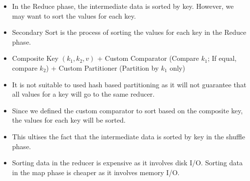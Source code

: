 \documentclass[10pt, landscape]{article}
\begin{document}
\begin{multicols*}{4}
  \begin{itemize}
    \item In the Reduce phase, the intermediate data is sorted by key. However, we may want to sort the values for each key.
    \item Secondary Sort is the process of sorting the values for each key in the Reduce phase.
    \item Composite Key $(k_1, k_2, v)$ + Custom Comparator (Compare $k_1$; If equal, compare $k_2$) + Custom Partitioner (Partition by $k_1$ only)
    \item It is not suitable to used hash based partitioning as it will not guarantee that all values for a key will go to the same reducer.
    \item Since we defined the custom comparator to sort based on the composite key, the values for each key will be sorted.
    \item This ultises the fact that the intermediate data is sorted by key in the shuffle phase.
    \item Sorting data in the reducer is expensive as it involves disk I/O. Sorting data in the map phase is cheaper as it involves memory I/O.
  \end{itemize}


\end{multicols*}
\end{document}
